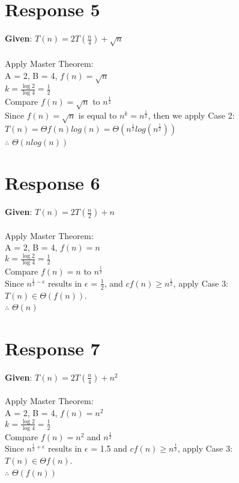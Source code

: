 \documentclass[12pt, a4paper]{article}
\begin{document}
\section*{\centering Response 5}
    \textbf{Given}: \(T(n) = 2T(\frac{n}{4}) + \sqrt{n}\)\\
    \\
    Apply Master Theorem:\\
    A = 2, B = 4, \(f(n) = \sqrt{n}\)\\
    \(k = \frac{\log{2}}{\log{4}} = \frac{1}{2}\)\\
    Compare \(f(n) = \sqrt{n}\) to \(n^{\frac{1}{2}}\)\\
    Since \(f(n) = \sqrt{n}\) is equal to \(n^k = n^{\frac{1}{2}}\), then we apply Case 2:\\
    \(T(n) = \Theta{f(n)log(n)} = \Theta{(n^{\frac{1}{2}}log(n^{\frac{1}{2}}))}\)\\
    $\therefore$ \(\Theta{(nlog(n))}\)

\section*{\centering Response 6}
    \textbf{Given}: \(T(n)=2T(\frac{n}{2}) + n\)\\
    \\
    Apply Master Theorem:\\
    A = 2, B = 4, \(f(n) = n\)\\
    \(k = \frac{\log{2}}{\log{4}} = \frac{1}{2}\)\\
    Compare \(f(n) = n\) to \(n^{\frac{1}{2}}\)\\
    Since \(n^{\frac{1}{2} - \epsilon}\) results in $\epsilon$ = $\frac{1}{2}$, and \(cf(n) \geq n^{\frac{1}{2}}\), apply Case 3:\\
    \(T(n) \in \Theta{(f(n))}\).\\
    $\therefore$ $\Theta{(n)}$\\

\section*{\centering Response 7}
    \textbf{Given}: \(T(n)=2T(\frac{n}{4})+n^2\)\\
    \\
    Apply Master Theorem:\\
    A = 2, B = 4, \(f(n) = n^2\)\\
    \(k = \frac{\log{2}}{\log{4}} = \frac{1}{2}\)\\
    Compare \(f(n) = n^2\) and \(n^{\frac{1}{2}}\)\\
    Since \(n^{\frac{1}{2}+\epsilon}\) results in $\epsilon$ = 1.5 and \(cf(n) \geq n^{\frac{1}{2}}\), apply Case 3:\\
    \(T(n) \in \Theta{f(n)}\).\\
    $\therefore$ $\Theta{(f(n))}$
\end{document}
